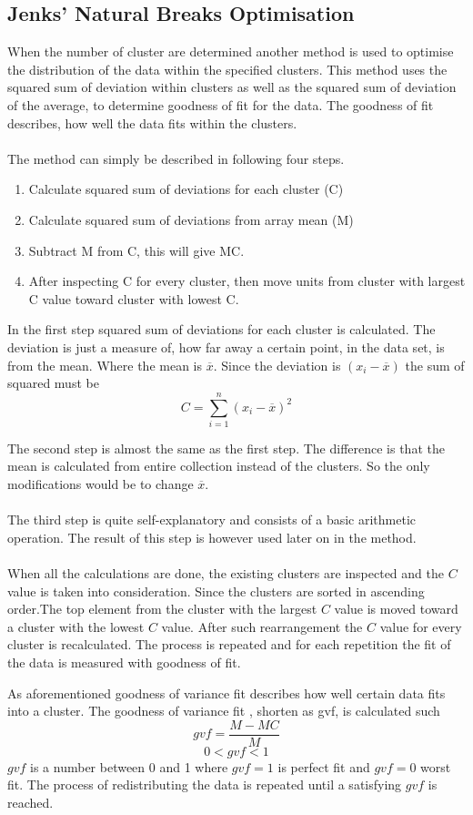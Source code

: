 \subsection{Jenks' Natural Breaks Optimisation}
\label{sub:jenks} 
When the number of cluster are determined another method is used to optimise the distribution of the data within the specified clusters. This method uses the squared sum of deviation within clusters as well as the squared sum of deviation of the average, to determine goodness of fit for the data. The goodness of fit describes, how well the data fits within the clusters.
\\\\
The method can simply be described in following four steps.
\begin{enumerate}
  \item Calculate squared sum of deviations for each cluster (C)
  \item Calculate squared sum of deviations from array mean (M)
  \item Subtract M from C, this will give MC.
  \item After inspecting C for every cluster, then move units from cluster with largest C value toward cluster with lowest C.
\end{enumerate}
In the first step squared sum of deviations for each cluster is calculated. The deviation is just a measure of, how far away a certain point, in the data set, is from the mean. Where the mean is $\overline{x}$. Since the deviation is $(x_i-\overline{x})$ the sum of squared must be $$C= \displaystyle\sum_{i=1}^{n}(x_i-\overline{x})^2$$

The second step is almost the same as the first step. The difference is that the mean is calculated from entire collection instead of the clusters. So the only modifications would be to change $\overline{x}$.
\\\\
The third step is quite self-explanatory and consists of a basic arithmetic operation. The result of this step is however used later on in the method.
\\\\
When all the calculations are done, the existing clusters are inspected and the $C$ value is taken into consideration. Since the clusters are sorted in ascending order.The top element from the cluster with the largest $C$ value is moved toward a cluster with the lowest $C$ value. After such rearrangement the $C$ value for every cluster is recalculated. The process is repeated and for each repetition the fit of the data is measured with goodness of fit.


As aforementioned goodness of variance fit describes how well certain data fits into a cluster. The goodness of variance fit , shorten as gvf, is calculated such $$gvf = \frac{M-MC}{M}$$
$$0<gvf<1$$
$gvf$ is a number between 0 and 1 where $gvf = 1$ is perfect fit and $gvf = 0$ worst fit.
The process of redistributing the data is repeated until a satisfying $gvf$ is reached.
